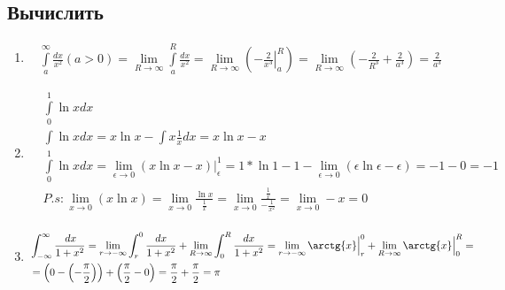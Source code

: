 \documentclass[a4paper, 12pt]{article}
\newcommand{\dx}{\,dx}
\newcommand{\lr}[1]{\left({#1}\right)}
\begin{document}
\subsection{Вычислить}
\begin{enumerate}
 \item %
\begin{align*}
    \int\limits_a^\infty \frac{dx}{x^2} \lr{a>0} = \lim\limits_{R\to\infty} \int\limits_a^R \frac{dx}{x^2}=  \lim\limits_{R\to\infty} \lr{\left.-\frac{2}{x^3}\right|_a^R}= \lim\limits_{R\to\infty} \lr{-\frac{2}{R^3}+\frac{2}{a^3}} = \frac{2}{a^3}
\end{align*}
\item %
\begin{align*}
    &\int\limits_0^1\ln xdx \\
    &\int \ln xdx = x\ln x - \int x\frac{1}{x}dx = x\ln x-x \\
    &\int\limits_0^1\ln xdx =\lim_{\epsilon \to 0} 
    (x\ln x - x)\Big|_\epsilon^1 = 
    1*\ln1 -1 - \lim_{\epsilon \to 0} \left( \epsilon \ln \epsilon - \epsilon \right)= 
    -1 - 0 = -1 \\
    & P.s:
    \lim\limits_{x \to 0}(x\ln x) = 
    \lim\limits_{x \to 0}\frac{\ln x}{\frac{1}{x}}= 
    \lim\limits_{x \to 0}\frac{\frac{1}{x}}{-\frac{1}{x^2}}= 
    \lim\limits_{x \to 0}-x = 0 \\
    \end{align*}
    
    \item %
    \begin{align*}
  &\int_{-\infty}^{\infty} \frac{\dx}{1+x^2}
  = \lim_{r \to -\infty} \int_{r}^{0} \frac{dx}{1+x^2} + \lim_{R \to \infty}\int_{0}^{R}\frac{dx}{1+x^2} 
= \lim_{r\to -\infty} \arctg{x}\Big|^0_r + \lim_{R\to\infty}\arctg{x}\Big|^R_0 = \\
&= \left(0-\left(-\frac{\pi}{2}\right)\right) + \left(\frac{\pi}{2} - 0\right) 
=\frac{\pi}{2} + \frac{\pi}{2} = \pi 
\end{align*}


\end{enumerate}
\end{document}
